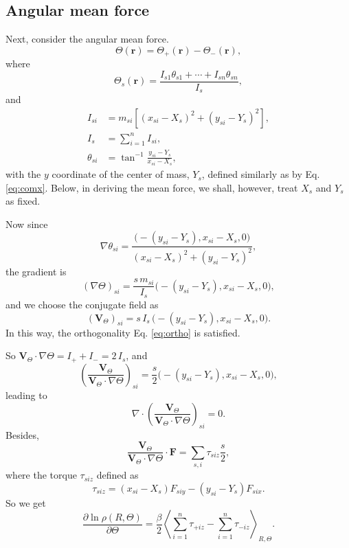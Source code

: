 \documentclass{article}
\begin{document}
\subsection{Angular mean force}

Next, consider the angular mean force.
$$
\Theta(\mathbf r) = \Theta_+(\mathbf r) - \Theta_-(\mathbf r)
,
$$
where
$$
\Theta_s(\mathbf r)
=
\frac{ I_{s1} \theta_{s1} + \cdots + I_{sn} \theta_{sn} }
     { I_s }
,
$$
and
$$
\begin{aligned}
I_{si}
&=
m_{si}
\left[
  (x_{si} - X_s)^2
  +
  (y_{si} - Y_s)^2
\right],
\\
I_s
&= \sum_{i = 1}^n I_{si},
\\
\theta_{si}
&=
\tan^{-1}
\frac{ y_{si} - Y_s }
     { x_{si} - X_s }
,
\end{aligned}
$$
with the $y$ coordinate of the center of mass, $Y_s$,
defined similarly as by Eq. \eqref{eq:comx}.
%
Below, in deriving the mean force,
we shall, however, treat $X_s$ and $Y_s$
as fixed.

Now since
$$
\nabla \theta_{si}
=
\frac{
  \bigl(
   -(y_{si} - Y_s),
   x_{si} - X_s,
   0
  \bigr)
}
{ (x_{si} - X_s)^2 + (y_{si} - Y_s)^2 }
,
$$
the gradient is
$$
\left( \nabla \Theta \right)_{si}
=
\frac{ s \, m_{si} }
{ I_s }
  \bigl(
   -(y_{si} - Y_s),
   x_{si} - X_s,
   0
  \bigr)
,
$$
and we choose the conjugate field as
\begin{equation}
\left( \mathbf V_\Theta \right)_{si}
=
s \, I_s \,
  \bigl(
   -(y_{si} - Y_s),
   x_{si} - X_s,
   0
  \bigr)
.
\end{equation}
In this way,
the orthogonality Eq. \eqref{eq:ortho}
is satisfied.

So $\mathbf V_\Theta \cdot \nabla \Theta = I_+ + I_- = 2 \, I_s$,
and
$$
  \left( \frac{ \mathbf V_\Theta } { \mathbf V_\Theta \cdot \nabla \Theta } \right)_{si}
  =
  \frac s 2
  \bigl(
   -(y_{si} - Y_s),
   x_{si} - X_s,
   0
  \bigr)
  ,
$$
leading to
$$
  \nabla \cdot
  \left( \frac{ \mathbf V_\Theta } { \mathbf V_\Theta \cdot \nabla \Theta } \right)_{si}
  = 0.
$$
Besides,
$$
  \frac{ \mathbf V_\Theta }
  { \mathbf V_\Theta \cdot \nabla \Theta } \cdot \mathbf F
  =
  \sum_{s, i} \tau_{siz} \frac{ s } { 2 }
  ,
$$
where the torque $\tau_{siz}$ defined as
$$
\tau_{siz}
=
(x_{si} - X_s) F_{siy}
-
(y_{si} - Y_s) F_{six}
.
$$
So we get
$$
\frac{ \partial \ln \rho(R, \Theta) }
     { \partial \Theta }
=
\frac \beta 2
\left\langle
  \sum_{i = 1}^n \tau_{+iz}
  -
  \sum_{i = 1}^n \tau_{-iz}
\right\rangle_{R, \Theta}
.
$$
\end{document}
